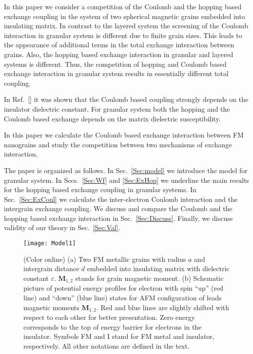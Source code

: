 \documentclass[aps,prb,amsmath,amssymb,twocolumn,superscriptaddress,showpacs,floatfix]{revtex4-1}
\begin{document}
In this paper we consider a competition of the Coulomb and the hopping based exchange coupling
in the system of two spherical magnetic grains embedded into insulating matrix. In contrast
to the layered system the screening of the Coulomb interaction in granular system is different
due to finite grain sizes. This leads to the appearance of additional terms in the total
exchange interaction between grains. Also, the hopping based exchange interaction
in granular and layered systems is different. Thus, the competition of hopping and Coulomb
based exchange interaction in granular system results in essentially different total coupling.

In Ref.~[] it was shown that the Coulomb based coupling strongly
depends on the insulator dielectric constant. For granular system
both the hopping and the Coulomb based exchange depends on the matrix dielectric susceptibility.

In this paper we calculate the Coulomb based exchange interaction
between FM nanograins and study the competition between two mechanisms of exchange interaction.

The paper is organized as follows. In Sec.~\ref{Sec:model} we introduce
the model for granular system. In Secs.~\ref{Sec:Wf} and \ref{Sec:ExHop} we underline the main
results for the hopping based exchange coupling in granular systems. In Sec.~\ref{Sec:ExCoul} we
calculate the inter-electron Coulomb interaction and the intergrain exchange coupling.
We discuss and compare the Coulomb and the hopping based exchange interaction in Sec.~\ref{Sec:Discuss}.
Finally, we discuss validity of our theory in Sec.~\ref{Sec:Val}.
\begin{figure}
\texttt{[image: Model1]}
\caption{(Color online) (a) Two FM metallic grains with radius $a$ and intergrain distance $d$ embedded
into insulating matrix with dielectric constant $\varepsilon$. $\mathbf M_{1,2}$ stands for grain
magnetic moment. (b) Schematic picture of potential energy profiles
for electron with spin ``up'' (red line) and ``down'' (blue line)
states for AFM configuration of leads magnetic moments $\mathbf M_{1,2}$.
Red and blue lines are slightly shifted with respect to each other for better presentation.
Zero energy corresponds to the top of energy barrier for electrons in the insulator.
Symbols FM and I stand for FM metal and insulator, respectively.
All other notations are defined in the text. } \label{Fig:EnExp}
\end{figure}
\end{document}
